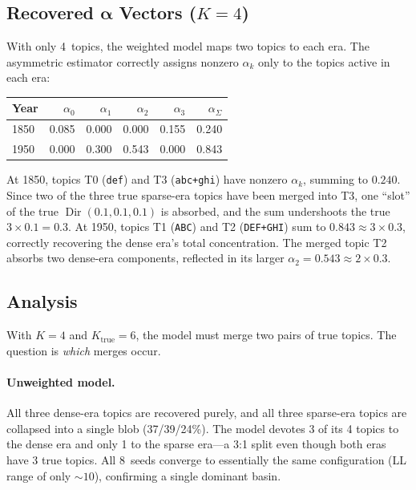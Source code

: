 \documentclass[11pt]{article}
\begin{document}
\subsection{Recovered $\boldsymbol\alpha$ Vectors ($K=4$)}

With only 4~topics, the weighted model maps two topics to each era.
The asymmetric estimator correctly assigns nonzero $\alpha_k$ only to the topics active in each era:

\begin{center}
\begin{tabular}{@{}l rrrr r@{}}
\toprule
\textbf{Year} & $\alpha_0$ & $\alpha_1$ & $\alpha_2$ & $\alpha_3$ & $\alpha_\Sigma$ \\
\midrule
1850 & 0.085 & 0.000 & 0.000 & 0.155 & 0.240 \\
1950 & 0.000 & 0.300 & 0.543 & 0.000 & 0.843 \\
\bottomrule
\end{tabular}
\end{center}

At 1850, topics T0 (\texttt{def}) and T3 (\texttt{abc+ghi}) have nonzero $\alpha_k$, summing to $0.240$.
Since two of the three true sparse-era topics have been merged into T3, one ``slot'' of the true $\operatorname{Dir}(0.1,0.1,0.1)$ is absorbed, and the sum undershoots the true $3 \times 0.1 = 0.3$.
At 1950, topics T1 (\texttt{ABC}) and T2 (\texttt{DEF+GHI}) sum to $0.843 \approx 3 \times 0.3$, correctly recovering the dense era's total concentration.
The merged topic T2 absorbs two dense-era components, reflected in its larger $\alpha_2 = 0.543 \approx 2 \times 0.3$.

\subsection{Analysis}

With $K=4$ and $K_{\text{true}}=6$, the model must merge two pairs of true topics.
The question is \emph{which} merges occur.

\paragraph{Unweighted model.}
All three dense-era topics are recovered purely, and all three sparse-era topics are collapsed into a single blob (37/39/24\%).
The model devotes 3 of its 4 topics to the dense era and only 1 to the sparse era---a 3:1 split even though both eras have 3 true topics.
All 8~seeds converge to essentially the same configuration (LL range of only ${\sim}10$), confirming a single dominant basin.
\end{document}
